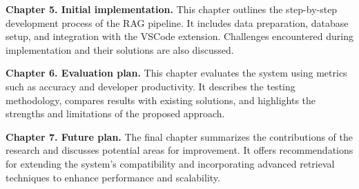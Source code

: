 \textbf{Chapter 5. Initial implementation.} 
This chapter outlines the step-by-step development process of the RAG pipeline. It includes data preparation, database setup, and integration with the VSCode extension. Challenges encountered during implementation and their solutions are also discussed.

\textbf{Chapter 6. Evaluation plan.} 
This chapter evaluates the system using metrics such as accuracy and developer productivity. It describes the testing methodology, compares results with existing solutions, and highlights the strengths and limitations of the proposed approach.

\textbf{Chapter 7. Future plan.} 
The final chapter summarizes the contributions of the research and discusses potential areas for improvement. It offers recommendations for extending the system’s compatibility and incorporating advanced retrieval techniques to enhance performance and scalability.


